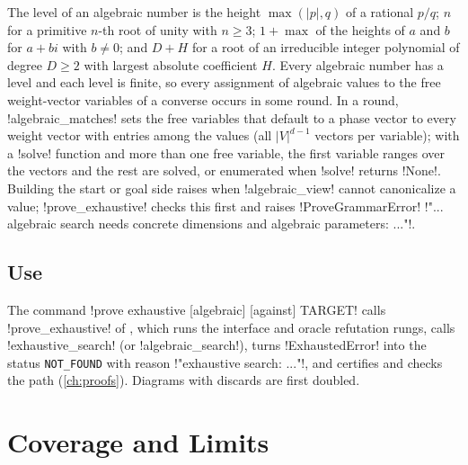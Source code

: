 The level of an algebraic number is the height $\max(|p|,q)$ of a rational $p/q$; $n$ for a
primitive $n$-th root of unity with $n\ge3$; $1+\max$ of the heights of $a$ and $b$ for $a+bi$ with
$b\neq0$; and $D+H$ for a root of an irreducible integer polynomial of degree $D\ge2$ with largest
absolute coefficient $H$. Every algebraic number has a level and each level is finite, so every
assignment of algebraic values to the free weight-vector variables of a converse occurs in some
round. In a round, \py!algebraic_matches! sets the free variables that default to a phase vector to
every weight vector with entries among the values (all $|V|^{d-1}$ vectors per variable); with a
\py!solve! function and more than one free variable, the first variable ranges over the vectors and
the rest are solved, or enumerated when \py!solve! returns \py!None!. Building the start or goal side
raises when \py!algebraic_view! cannot canonicalize a value; \py!prove_exhaustive! checks this first
and raises \py!ProveGrammarError! \code!"... algebraic search needs concrete dimensions and algebraic parameters: ..."!.

\subsection{Use}

The command \azx!prove exhaustive [algebraic] [against] TARGET! calls \py!prove_exhaustive! of
, which runs the interface and oracle refutation rungs, calls
\py!exhaustive_search! (or \py!algebraic_search!), turns \py!ExhaustedError! into the status
\texttt{NOT\_FOUND} with reason \code!"exhaustive search: ..."!, and certifies and checks the path
(\cref{ch:proofs}). Diagrams with discards are first doubled.

\section{Coverage and Limits}\label{sec:completeness-limits}

